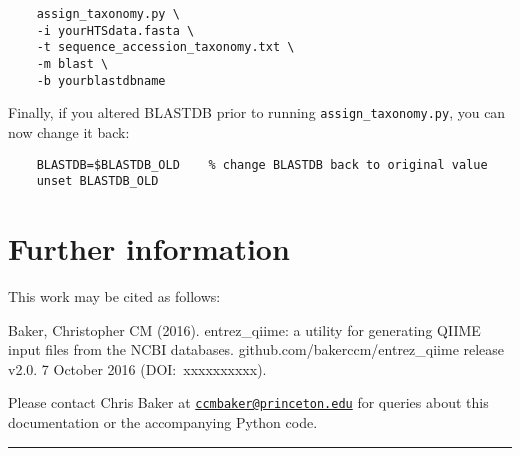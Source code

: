\documentclass[11pt]{amsart}
\begin{document}
\begin{verbatim}
    assign_taxonomy.py \
    -i yourHTSdata.fasta \
    -t sequence_accession_taxonomy.txt \
    -m blast \
    -b yourblastdbname
\end{verbatim}

Finally, if you altered BLASTDB prior to running \verb|assign_taxonomy.py|, you can now change it back:

\begin{verbatim}
    BLASTDB=$BLASTDB_OLD    % change BLASTDB back to original value
    unset BLASTDB_OLD
\end{verbatim}

\section{Further information}
\label{section:misc}

This work may be cited as follows:

Baker, Christopher CM (2016). entrez\_qiime: a utility for generating QIIME input files from the NCBI databases. github.com/bakerccm/entrez\_qiime release v2.0. 7 October 2016 (DOI:~xxxxxxxxxx).

Please contact Chris Baker at \href{mailto:ccmbaker@princeton.edu}{\tt ccmbaker@princeton.edu} for queries about this documentation or the accompanying Python code.

\vspace{18pt}
\hrule
\end{document}
